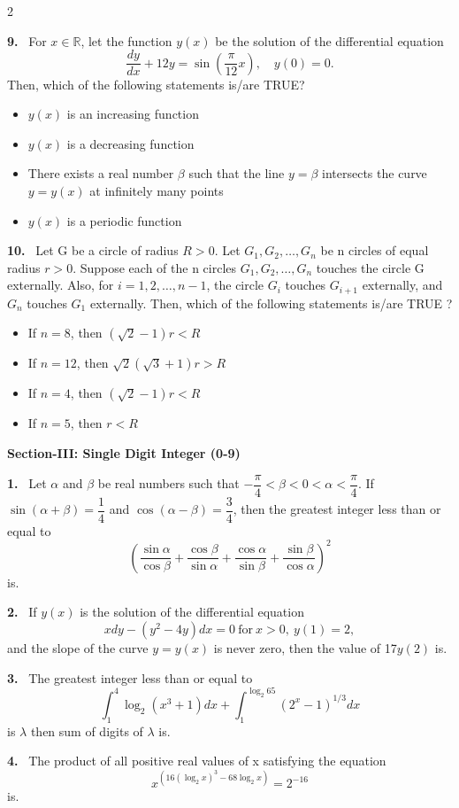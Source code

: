\documentclass[10pt]{extarticle}
\newcommand{\sect}[1]{\par\smallskip\noindent\textbf{#1}\par}
\newcommand{\qn}[1]{\par\smallskip\noindent\textbf{#1.}~}
\newenvironment{qoptions}{\begin{itemize}[leftmargin=1.8em,itemsep=1pt,topsep=2pt,label={}]}{\end{itemize}}
\newcommand{\opt}[2]{\item[(#1)] #2}
\begin{document}
\begin{multicols}{2}
\qn{9} For $x\in\mathbb R$, let the function $y(x)$ be the solution of the differential equation
\[\dfrac{dy}{dx}+12y = \sin\left(\dfrac{\pi}{12}x\right),\quad y(0)=0.\]
Then, which of the following statements is/are TRUE?
\begin{qoptions}
\opt{A}{$y(x)$ is an increasing function}
\opt{B}{$y(x)$ is a decreasing function}
\opt{C}{There exists a real number $\beta$ such that the line $y=\beta$ intersects the curve $y=y(x)$ at infinitely many points}
\opt{D}{$y(x)$ is a periodic function}
\end{qoptions}

\qn{10} Let G be a circle of radius $R>0$. Let $G_1,G_2,\ldots,G_n$ be n circles of equal radius $r>0$. Suppose each of the n circles $G_1,G_2,\ldots,G_n$ touches the circle G externally. Also, for $i=1,2,\ldots,n-1$, the circle $G_i$ touches $G_{i+1}$ externally, and $G_n$ touches $G_1$ externally. Then, which of the following statements is/are TRUE ?
\begin{qoptions}
\opt{A}{If $n=8$, then $(\sqrt2-1)r<R$}
\opt{B}{If $n=12$, then $\sqrt2(\sqrt3+1)r>R$}
\opt{C}{If $n=4$, then $(\sqrt2-1)r<R$}
\opt{D}{If $n=5$, then $r<R$}
\end{qoptions}

\sect{Section-III: Single Digit Integer (0-9)}

\qn{1} Let $\alpha$ and $\beta$ be real numbers such that $-\dfrac{\pi}{4}<\beta<0<\alpha<\dfrac{\pi}{4}$. If $\sin(\alpha+\beta)=\dfrac14$ and $\cos(\alpha-\beta)=\dfrac34$, then the greatest integer less than or equal to
\[\left(\dfrac{\sin\alpha}{\cos\beta}+\dfrac{\cos\beta}{\sin\alpha}+\dfrac{\cos\alpha}{\sin\beta}+\dfrac{\sin\beta}{\cos\alpha}\right)^2\]
is\underline{\hspace{2em}}.

\qn{2} If $y(x)$ is the solution of the differential equation
\[xdy-(y^2-4y)dx=0\ \text{for}\ x>0,\ y(1)=2,\]
and the slope of the curve $y=y(x)$ is never zero, then the value of 17$y(2)$ is\underline{\hspace{2em}}.

\qn{3} The greatest integer less than or equal to
\[\int_1^4 \log_2(x^3+1)dx + \int_1^{\log_2 65}(2^x-1)^{1/3}dx\]
is $\lambda$ then sum of digits of $\lambda$ is\underline{\hspace{2em}}.

\qn{4} The product of all positive real values of x satisfying the equation
\[x^{\left(16(\log_2 x)^3-68\log_2 x\right)} = 2^{-16}\]
is\underline{\hspace{2em}}.


\end{multicols}
\end{document}
